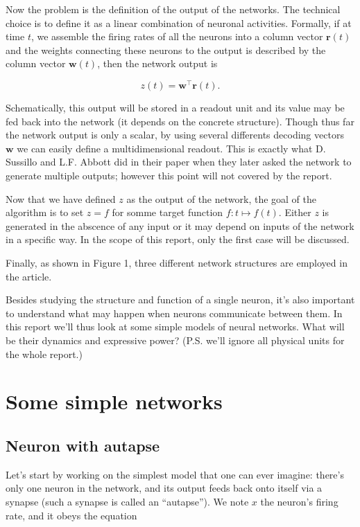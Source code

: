 Now the problem is the definition of the output of the networks. The
technical choice is to define it as a linear combination of neuronal
activities. Formally, if at time $t$, we assemble the firing rates of all
the neurons into a column vector $\mathbf{r}(t)$ and the weights 
connecting these neurons to the output is described by the column vector
$\mathbf{w}(t)$, then the network output is

\[z(t) = \mathbf{w}^{\top}\mathbf{r}(t).\]

\noindent
Schematically, this output will be stored in a readout unit and its
value may be fed back into the network (it depends on the concrete
structure). Though thus far the network output is only a scalar, by using
several differents decoding vectors $\mathbf{w}$ we can easily define
a multidimensional readout. This is exactly what D. Sussillo and L.F.
Abbott did in their paper when they later asked the network to generate
multiple outputs; however this point will not covered by the report.

Now that we have defined $z$ as the output of the network, the goal
of the algorithm is to set $z = f$ for somme target function 
$f: t \mapsto f(t)$. Either $z$ is generated in the abscence of any input
or it may depend on inputs of the network in a specific way. In the scope
of this report, only the first case will be discussed.

Finally, as shown in Figure 1, three different network structures are 
employed in the article.

\iffalse

Besides studying the structure and function of a single neuron, it's also
important to understand what may happen when neurons communicate between them.
In this report we'll thus look at some simple models of neural networks.
What will be their dynamics and expressive power? 
(P.S. we'll ignore all physical units for the whole report.)

\section{Some simple networks}

\subsection{Neuron with autapse}

Let's start by working on the simplest model that one can ever imagine:
there's only one neuron in the network, and its output feeds back onto 
itself via a synapse (such a synapse is called an ``autapse''). 
We note $x$ the neuron's firing rate, and it obeys the equation

